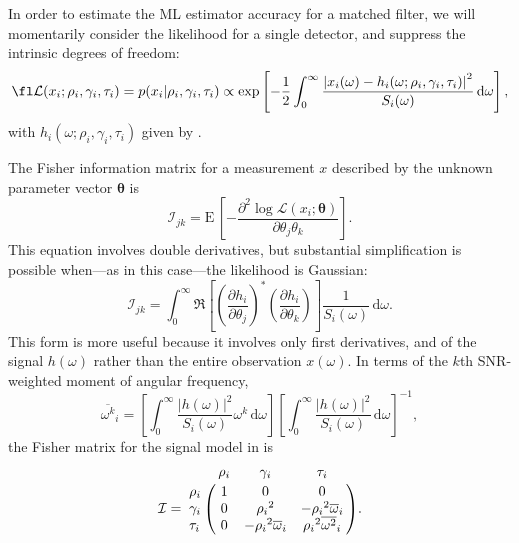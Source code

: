 \documentclass{iopart}
\begin{document}
In order to estimate the \ac{ML} estimator accuracy for a matched filter, we will momentarily consider the likelihood for a single detector, and suppress the intrinsic degrees of freedom:
%
\begin{equation}\label{eq:gaussian-likelihood-spa}
	\fl\mathcal{L}(x_i; \rho_i, \gamma_i, \tau_i) = p(x_i | \rho_i, \gamma_i, \tau_i)
		\propto \exp \left[
		- \frac{1}{2} \int_0^\infty \frac{\left|x_i (\omega)
			- h_i(\omega; \rho_i, \gamma_i, \tau_i) \right|^2}{S_i(\omega)} \, \mathrm{d}\omega
	\right],
\end{equation}
%
with $h_i(\omega; \rho_i, \gamma_i, \tau_i)$ given by .

The Fisher information matrix for a measurement $x$ described by the unknown parameter vector $\boldsymbol{\theta}$ is
%
\begin{equation}\label{eq:general-fisher-matrix}
	\mathcal{I}_{jk} = \mathrm{E} \, \left[
		-\frac{\partial^2 \log
			\mathcal{L}(x_i ; \boldsymbol\theta)}
			{\partial \theta_j \theta_k}
	\right].
\end{equation}
%
This equation involves double derivatives, but substantial simplification is possible when---as in this case---the likelihood is Gaussian:
%
\begin{equation}\label{eq:gaussian-fisher-matrix}
	\mathcal{I}_{jk} = \int_0^\infty \Re \left[
        \left(\frac{\partial h_i}{\partial \theta_j}\right)^*
        \left(\frac{\partial h_i}{\partial \theta_k}\right)
	\right] \frac{1}{S_i(\omega)} \, \mathrm{d}\omega.
\end{equation}
%
This form is more useful because it involves only first derivatives, and of the signal $h (\omega)$ rather than the entire observation $x (\omega)$. In terms of the $k$th \ac{SNR}-weighted moment of angular frequency,
%
\begin{equation}\label{eq:angular-frequency-moments}
    {\overline{\omega^k}}_i =
        \left[ \int_0^\infty \frac{|h (\omega)|^2}{S_i(\omega)} \omega^k \, \mathrm{d}\omega \right]
        \left[ \int_0^\infty \frac{|h (\omega)|^2}{S_i(\omega)} \, \mathrm{d}\omega \right]^{-1},
\end{equation}
%
the Fisher matrix for the signal model in  is
%
\begin{equation}\label{eq:fisher-matrix}
	\mathcal{I} = \bordermatrix{
        ~ & \rho_i & \gamma_i & \tau_i \cr
        \rho_i & 1 & 0 & 0 \cr
        \gamma_i & 0 & {\rho_i}^2 & -{\rho_i}^2 {\overline{\omega}}_i \cr
        \tau_i & 0 & -{\rho_i}^2 {\overline{\omega}}_i & {\rho_i}^2 {\overline{\omega^2}}_i
    }.
\end{equation}
\end{document}
